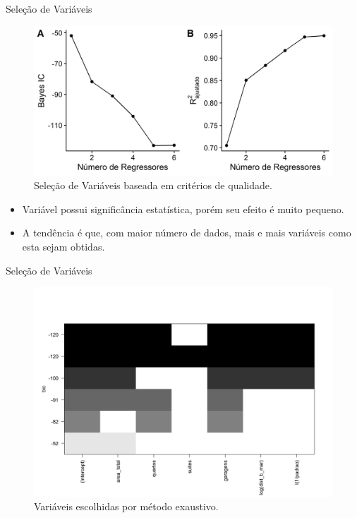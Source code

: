 \documentclass[9pt,ignorenonframetext,aspectratio=169]{beamer}
\providecommand{\tightlist}{%
  \setlength{\itemsep}{0pt}\setlength{\parskip}{0pt}}
\begin{document}
\begin{frame}{Seleção de Variáveis}
\protect\hypertarget{seleuxe7uxe3o-de-variuxe1veis-2}{}

\begin{figure}

{\centering \includegraphics[width=0.8\linewidth]{images/regsub2-1} 

}

\caption{Seleção de Variáveis baseada em critérios de qualidade.}\label{fig:regsub2}
\end{figure}

\begin{itemize}[<+->]
\tightlist
\item
  Variável possui significância estatística, porém seu efeito é muito
  pequeno.
\item
  A tendência é que, com maior número de dados, mais e mais variáveis
  como esta sejam obtidas.
\end{itemize}

\end{frame}

\begin{frame}{Seleção de Variáveis}
\protect\hypertarget{seleuxe7uxe3o-de-variuxe1veis-3}{}

\begin{figure}

{\centering \includegraphics[width=0.7\linewidth]{images/regsub-1} 

}

\caption{Variáveis escolhidas por método exaustivo.}\label{fig:regsub}
\end{figure}

\end{frame}
\end{document}
